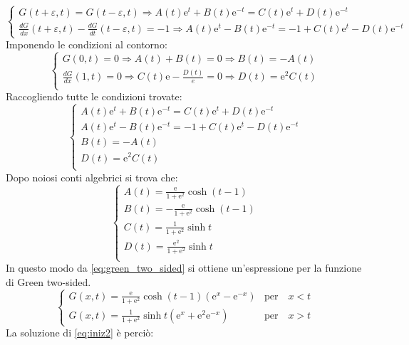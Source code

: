 \documentclass[]{scrartcl}
\begin{document}
\[
\begin{cases}
G(t+\varepsilon,t) = G(t-\varepsilon,t) \Rightarrow A(t)\mathrm{e}^t + B(t)\mathrm{e}^{-t} = C(t)\mathrm{e}^t + D(t)\mathrm{e}^{-t} \\
\frac{dG}{dx}(t+\varepsilon,t) - \frac{dG}{dt}(t-\varepsilon,t) = -1 \Rightarrow A(t)\mathrm{e}^t - B(t)\mathrm{e}^{-t} = -1 + C(t)\mathrm{e}^t - D(t)\mathrm{e}^{-t}
\end{cases}{}
\]
Imponendo le condizioni al contorno:
\[
\begin{cases}
G(0,t) = 0 \Rightarrow A(t)  + B(t) = 0 \Rightarrow B(t) = -A(t) \\
\frac{dG}{dx}(1,t) = 0 \Rightarrow C(t)\mathrm{e}  - \frac{D(t)}{e} = 0 \Rightarrow D(t) = \mathrm{e}^2C(t) \\
\end{cases}{}
\]
Raccogliendo tutte le condizioni trovate:
\[
\begin{cases}
A(t)\mathrm{e}^t + B(t)\mathrm{e}^{-t} = C(t)\mathrm{e}^t + D(t)\mathrm{e}^{-t}\\
A(t)\mathrm{e}^t - B(t)\mathrm{e}^{-t} =  -1 + C(t)\mathrm{e}^t - D(t)\mathrm{e}^{-t}\\
B(t) = -A(t) \\
D(t) = \mathrm{e}^2C(t) \\
\end{cases}{}
\]
Dopo noiosi conti algebrici si trova che:
\[
\begin{cases}
A(t) = \frac{\mathrm{e}}{1+\mathrm{e}^2}\cosh(t-1)\\
B(t) = -\frac{\mathrm{e}}{1+\mathrm{e}^2}\cosh(t-1)\\
C(t) = \frac{1}{1+\mathrm{e}^2}\sinh t\\
D(t) = \frac{\mathrm{e}^2}{1+\mathrm{e}^2}\sinh t \\
\end{cases}{}
\]
In questo modo da \eqref{eq:green_two_sided} si ottiene un'espressione per la funzione di Green two-sided.
\begin{equation}
\begin{cases}
G(x,t) = \frac{\mathrm{e}}{1+\mathrm{e}^2}\cosh(t-1)\left(\mathrm{e}^x - \mathrm{e}^{-x}\right) & \text{per} \quad x<t \\
G(x,t) = \frac{1}{1+\mathrm{e}^2}\sinh t \left( \mathrm{e}^x + \mathrm{e}^2\mathrm{e}^{-x}\right)  & \text{per} \quad x>t 
\label{eq:green_two_sided_trovata}
\end{cases}{}
\end{equation}
La soluzione di \eqref{eq:iniz2} è perciò:
\end{document}
